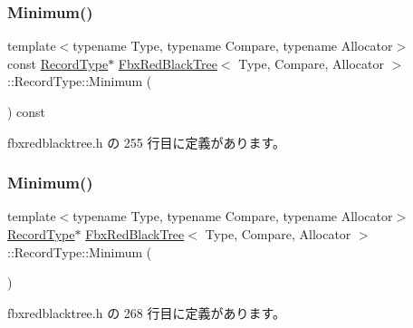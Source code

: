 \subsubsection{\texorpdfstring{Minimum()}{Minimum()}\hspace{0.1cm}{\footnotesize\ttfamily [1/2]}}
{\footnotesize\ttfamily template$<$typename Type, typename Compare, typename Allocator$>$ \\
const \hyperlink{class_fbx_red_black_tree_1_1_record_type}{Record\+Type}$\ast$ \hyperlink{class_fbx_red_black_tree}{Fbx\+Red\+Black\+Tree}$<$ Type, Compare, Allocator $>$\+::Record\+Type\+::\+Minimum (\begin{DoxyParamCaption}{ }\end{DoxyParamCaption}) const\hspace{0.3cm}{\ttfamily [inline]}}



 fbxredblacktree.\+h の 255 行目に定義があります。

\mbox{\label{class_fbx_red_black_tree_1_1_record_type_a19afa18da8e3def639d0f4e8e9ab1a39}} 
\subsubsection{\texorpdfstring{Minimum()}{Minimum()}\hspace{0.1cm}{\footnotesize\ttfamily [2/2]}}
{\footnotesize\ttfamily template$<$typename Type, typename Compare, typename Allocator$>$ \\
\hyperlink{class_fbx_red_black_tree_1_1_record_type}{Record\+Type}$\ast$ \hyperlink{class_fbx_red_black_tree}{Fbx\+Red\+Black\+Tree}$<$ Type, Compare, Allocator $>$\+::Record\+Type\+::\+Minimum (\begin{DoxyParamCaption}{ }\end{DoxyParamCaption})\hspace{0.3cm}{\ttfamily [inline]}}



 fbxredblacktree.\+h の 268 行目に定義があります。

\mbox{\label{class_fbx_red_black_tree_1_1_record_type_a10f8bec68c060c659f9f649449939cb2}} 
